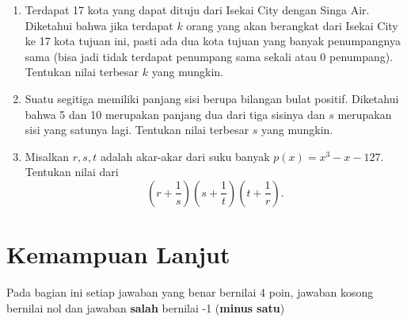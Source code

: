 \documentclass[12pt]{extarticle}
\begin{document}
\begin{enumerate}
		\item Terdapat 17 kota yang dapat dituju dari Isekai City dengan Singa Air. Diketahui bahwa jika terdapat $k$ orang yang akan berangkat dari Isekai City ke 17 kota tujuan ini, pasti ada dua kota tujuan yang banyak penumpangnya sama (bisa jadi tidak terdapat penumpang sama sekali atau 0 penumpang). Tentukan nilai terbesar $k$ yang mungkin.
		
		\item Suatu segitiga memiliki panjang sisi berupa bilangan bulat positif. Diketahui bahwa 5 dan 10 merupakan panjang dua dari tiga sisinya dan $s$ merupakan sisi yang satunya lagi. Tentukan nilai terbesar $s$ yang mungkin.
		
		\item Misalkan $r,s,t$ adalah akar-akar dari suku banyak $p(x)=x^3-x-127$. Tentukan nilai dari $$\left (r+\frac{1}{s} \right)\left(s+\frac{1}{t}\right)\left(t+\frac{1}{r}\right).$$  
	\end{enumerate}

\section{Kemampuan Lanjut}
Pada bagian ini setiap jawaban yang benar bernilai 4 poin, jawaban kosong bernilai nol
dan jawaban \textbf{salah} bernilai -1 (\textbf{minus satu})
\end{document}
